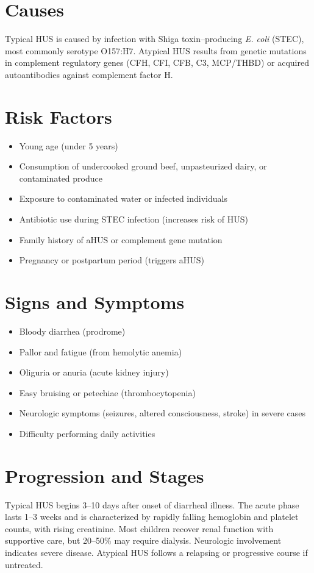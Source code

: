 \section{Causes}
Typical HUS is caused by infection with Shiga toxin--producing \emph{E. coli} (STEC), most commonly serotype O157:H7. Atypical HUS results from genetic mutations in complement regulatory genes (CFH, CFI, CFB, C3, MCP/THBD) or acquired autoantibodies against complement factor H.

\section{Risk Factors}
\begin{itemize}[noitemsep]
  \item Young age (under 5 years)
  \item Consumption of undercooked ground beef, unpasteurized dairy, or contaminated produce
  \item Exposure to contaminated water or infected individuals
  \item Antibiotic use during STEC infection (increases risk of HUS)
  \item Family history of aHUS or complement gene mutation
  \item Pregnancy or postpartum period (triggers aHUS)
\end{itemize}

\section{Signs and Symptoms}
\begin{itemize}[noitemsep]
  \item Bloody diarrhea (prodrome)
  \item Pallor and fatigue (from hemolytic anemia)
  \item Oliguria or anuria (acute kidney injury)
  \item Easy bruising or petechiae (thrombocytopenia)
  \item Neurologic symptoms (seizures, altered consciousness, stroke) in severe cases
  \item Difficulty performing daily activities
\end{itemize}

\section{Progression and Stages}
Typical HUS begins 3--10 days after onset of diarrheal illness. The acute phase lasts 1--3 weeks and is characterized by rapidly falling hemoglobin and platelet counts, with rising creatinine. Most children recover renal function with supportive care, but 20--50\% may require dialysis. Neurologic involvement indicates severe disease. Atypical HUS follows a relapsing or progressive course if untreated.

